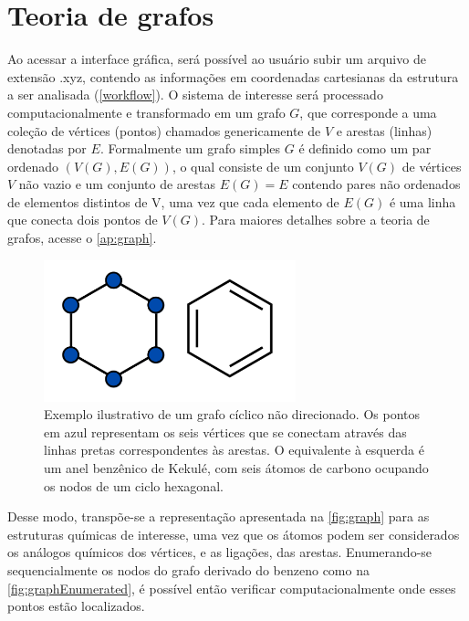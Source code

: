 \section{Teoria de grafos}

Ao acessar a interface gráfica, será possível ao usuário subir um arquivo de extensão .xyz, contendo as informações em coordenadas cartesianas da estrutura a ser analisada (\autoref{workflow}). O sistema de interesse será processado computacionalmente e transformado em um grafo $G$, que corresponde a uma coleção de vértices (pontos) chamados genericamente de $V$ e arestas (linhas) denotadas por $E$. Formalmente um grafo simples $G$ é definido como um par ordenado $(V(G), E(G))$, o qual consiste de um conjunto $V(G)$ de vértices $V$ não vazio e um conjunto de arestas $E(G) = E$ contendo pares não ordenados de elementos distintos de V, uma vez que cada elemento de $E(G)$ é uma linha que conecta dois pontos de $V(G)$. Para maiores detalhes sobre a teoria de grafos, acesse o \autoref{ap:graph}.

\begin{figure}[htb]
	\caption{\label{fig:M2} Exemplo ilustrativo de um grafo cíclico não direcionado. Os pontos em azul representam os seis vértices que se conectam através das linhas pretas correspondentes às arestas. O equivalente à esquerda é um anel benzênico de Kekulé, com seis átomos de carbono ocupando os nodos de um ciclo hexagonal.}
	\begin{center}
		\includegraphics[width=0.65\textwidth]{images/grafo(2).png}
	\end{center}
\end{figure}

Desse modo, transpõe-se a representação apresentada na \autoref{fig:graph} para as estruturas químicas de interesse, uma vez que os átomos podem ser considerados os análogos químicos dos vértices, e as ligações, das arestas. Enumerando-se sequencialmente os nodos do grafo derivado do benzeno como na \autoref{fig:graphEnumerated}, é possível então verificar computacionalmente onde esses pontos estão localizados.

